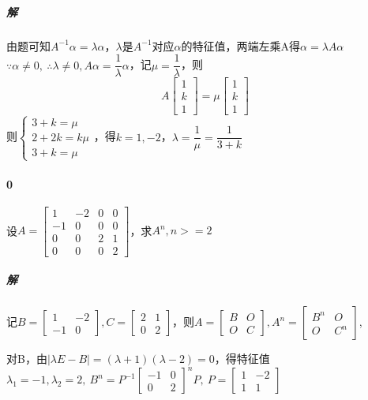 \subparagraph{解}
由题可知\(A^{-1}\alpha = \lambda\alpha\)，\(\lambda\)是\(A^{-1}\)对应\(\alpha\)的特征值，两端左乘A得\(\alpha = \lambda A\alpha\)
\(\because \alpha \neq 0,\ \therefore \lambda \neq 0, A\alpha = \dfrac{1}{\lambda}\alpha\)，记\(\mu = \dfrac{1}{\lambda}\)，则
\[A\begin{bmatrix}
    1 \\ 
    k \\ 
    1
\end{bmatrix} = \mu\begin{bmatrix}
    1 \\ 
    k \\ 
    1
\end{bmatrix}\]
则\(\begin{cases}
    3 + k = \mu \\ 
    2 + 2k = k\mu \\ 
    3 + k = \mu
\end{cases}\)，得\(k = 1, -2\)，\(\lambda = \dfrac{1}{\mu} = \dfrac{1}{3 + k}\)

\paragraph{0}
设\(A = \begin{bmatrix}
    1 & -2 & 0 & 0 \\ 
    -1 & 0 & 0 & 0 \\ 
    0 & 0 & 2 & 1 \\ 
    0 & 0 & 0 & 2
\end{bmatrix}\)，求\(A^n, n >= 2\)

\subparagraph{解}
记\(B = \begin{bmatrix}
    1 & -2 \\ 
    -1 & 0
\end{bmatrix}, C = \begin{bmatrix}
    2 & 1 \\ 
    0 & 2
\end{bmatrix}\)，则\(A = \begin{bmatrix}
    B & O \\ 
    O & C
\end{bmatrix}, A^n = \begin{bmatrix}
    B^n & O \\ 
    O & C^n
\end{bmatrix}\),

对B，由\(|\lambda E - B| = (\lambda + 1)(\lambda - 2) = 0\)，得特征值\(\lambda_1 = -1, \lambda_2 = 2,\ B^n = P^{-1}\begin{bmatrix}
    -1 & 0 \\ 
    0 & 2
\end{bmatrix}^nP,\ P = \begin{bmatrix}
    1 & -2 \\ 
    1 & 1
\end{bmatrix}\)


